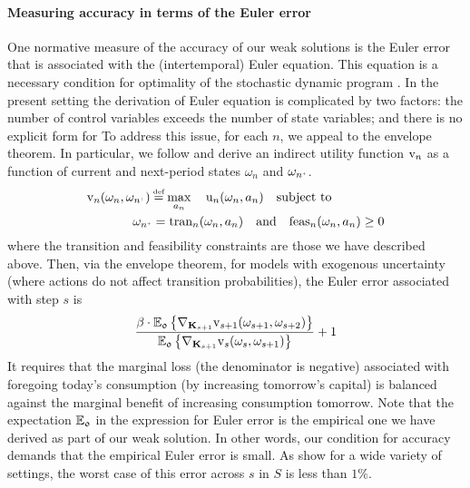 \documentclass[12pt,a4paper,twoside, draft]{article}
\begin{document}
\paragraph{Measuring accuracy in terms of the Euler error}
One normative measure of the accuracy of our weak solutions is the Euler error
that is associated with the (intertemporal) Euler equation.
This equation is a necessary condition for optimality of the stochastic dynamic
program \citet{Stokey_Lucas-Recursive}.
In the present setting the derivation of Euler equation is complicated by two
factors: the number of control variables exceeds the number of state variables;
and there is no explicit form for
To address this issue, for each $n$, we appeal to the envelope theorem.
In particular, we follow \citet{Gonzalez_Hernandez-Euler}
and derive an indirect utility function
$\textup{v}_{n}$ as a function of current and next-period states $\omega_{n}$
and $\omega_{n^{\mplus}}$.
\begin{align*}
   \textup{v}_{n}(\omega_{n}, \omega_{n^{\mplus}}) \defeq
   \max_{a_{n}}  \quad \textup{u}_{n}(\omega_{n}, a_{n}) \quad &
     \textup{subject to}\\
   \quad \omega_{n^{\mplus}} = \textup{tran}_{n}(\omega_{n}, a_{n}) \quad
   \textup{and} & \quad \textup{feas}_{n}(\omega_{n}, a_{n}) \geq 0
\end{align*}
where the transition and feasibility constraints are those we have described
above.
Then, via the envelope theorem, for models with exogenous uncertainty (where
actions do not affect transition probabilities), the Euler error associated
with step $s$ is
\begin{equation}
\frac{
  \beta \cdot \mathbb{E}_{\mathfrak{0}} \left\{
    \nabla_{\mathbf{K}_{s+1}} \textup{v}_{s+1}(\omega_{s+1}, \omega_{s+2})
  \right\}
  }{\mathbb{E}_{\mathfrak{0}} \left\{
    \nabla_{\mathbf{K}_{s+1}} \textup{v}_{s}(\omega_{s}, \omega_{s+1})
  \right\}
  } + 1
\end{equation}
It requires that the marginal loss (the denominator is negative) associated
with foregoing today's consumption (by increasing tomorrow's capital) is
balanced against the marginal benefit of increasing consumption tomorrow.
Note that the expectation $\mathbb E_{\mathfrak{0}}$ in the expression for
Euler error is the empirical one we have derived as part of our weak solution.
In other words, our condition for accuracy demands that the empirical Euler
error is small.
As \citet{CJ} show for a wide variety of settings, the worst case of this error
across $s$ in $S$ is less than $1\%$.
\end{document}
